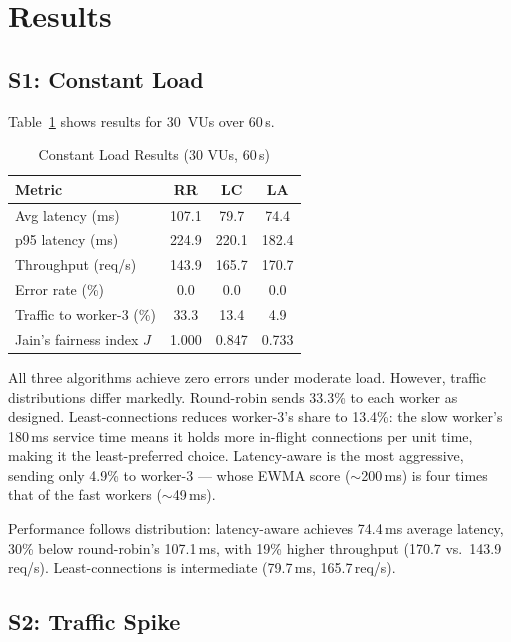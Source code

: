 \documentclass[conference]{IEEEtran}
\begin{document}
\section{Results}

\subsection{S1: Constant Load}

Table~\ref{tab:constant} shows results for 30~VUs over 60\,s.

\begin{table}[h]
\caption{Constant Load Results (30 VUs, 60\,s)}
\label{tab:constant}
\centering
\begin{tabular}{@{}lccc@{}}
\toprule
Metric & RR & LC & LA \\
\midrule
Avg latency (ms)          & 107.1 & 79.7  & 74.4  \\
p95 latency (ms)          & 224.9 & 220.1 & 182.4 \\
Throughput (req/s)        & 143.9 & 165.7 & 170.7 \\
Error rate (\%)           & 0.0   & 0.0   & 0.0   \\
Traffic to worker-3 (\%) & 33.3  & 13.4  & 4.9   \\
Jain's fairness index $J$ & 1.000 & 0.847 & 0.733 \\
\bottomrule
\end{tabular}
\end{table}

All three algorithms achieve zero errors under moderate load. However,
traffic distributions differ markedly. Round-robin sends 33.3\% to each
worker as designed. Least-connections reduces worker-3's share to 13.4\%:
the slow worker's 180\,ms service time means it holds more in-flight
connections per unit time, making it the least-preferred choice.
Latency-aware is the most aggressive, sending only 4.9\% to worker-3
--- whose EWMA score ($\sim$200\,ms) is four times that of the fast
workers ($\sim$49\,ms).

Performance follows distribution: latency-aware achieves
74.4\,ms average latency, 30\% below round-robin's 107.1\,ms, with 19\%
higher throughput (170.7 vs.\ 143.9\,req/s). Least-connections is
intermediate (79.7\,ms, 165.7\,req/s).

\subsection{S2: Traffic Spike}
\end{document}
